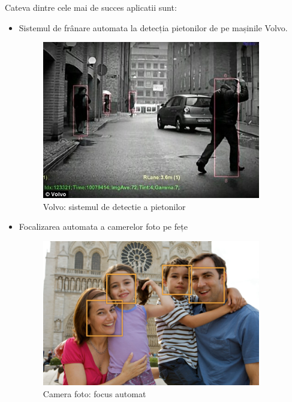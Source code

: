Cateva dintre cele mai de succes aplicatii sunt: 
\begin{itemize}
	\item Sistemul de frânare automata la detecția pietonilor de pe mașinile Volvo.	
	\begin{figure}[H]
		\centering
			\includegraphics[width=0.9\textwidth]{imagini/volvo_pedestrian_detection.jpg}
		\caption{Volvo: sistemul de detectie a pietonilor }
		\label{fig:volvo_pedestrian_detection}
	\end{figure}	
	
	\item Focalizarea automata a camerelor foto pe fețe		
	\begin{figure}[H]
		\centering
			\includegraphics[width=0.9\textwidth]{imagini/face_detection_2x.png}
		\caption{Camera foto: focus automat}
		\label{fig:face_detection_2x}
	\end{figure}
	

\end{itemize}
